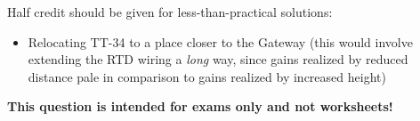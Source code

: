 \vskip 10pt

Half credit should be given for less-than-practical solutions:

\begin{itemize}
\item{} Relocating TT-34 to a place closer to the Gateway (this would involve extending the RTD wiring a {\it long} way, since gains realized by reduced distance pale in comparison to gains realized by increased height)
\end{itemize}







{\bf This question is intended for exams only and not worksheets!}



